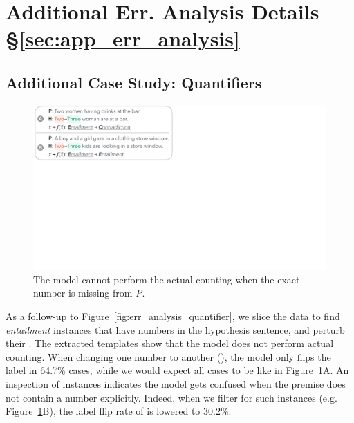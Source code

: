 \section{Additional Err. Analysis Details \S\ref{sec:app_err_analysis}}
\label{appendix:err_analysis}

\subsection{Additional Case Study: Quantifiers}
\label{appendix:err_analysis_quantifier_case}

\begin{figure}[t]
\centering
\includegraphics[trim={0 25.2cm 34.5cm 0cm},clip,width=1\columnwidth]{figures/err_analysis_two_three}
\vspace{-20pt}
\caption{
The \nli model cannot perform the actual counting when the exact number is missing from \emph{P}.
}
\vspace{-10pt}
\label{fig:err_analysis_two_three}
\end{figure}



As a follow-up to Figure~\ref{fig:err_analysis_quantifier}, we slice the data to find \emph{entailment} instances that have numbers in the hypothesis sentence, and perturb their .
The extracted templates show that the model does not perform actual counting. 
When changing one number to another (), the model only flips the label in 64.7\% cases, while we would expect all cases to be like in Figure~\ref{fig:err_analysis_two_three}A.
An inspection of instances indicates the model gets confused when the premise does not contain a number explicitly. 
Indeed, when we filter for such instances (e.g. Figure~\ref{fig:err_analysis_two_three}B), the label flip rate of  is lowered to 30.2\%.

